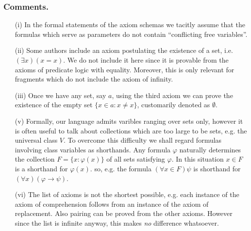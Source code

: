 \subsubsection{Comments.}
\begin{itemize}
\item[(i)] In the formal statements of the axiom schemas we tacitly assume that the formulas which serve as
           parameters do not contain ``conflicting free variables''.
\item[(ii)] Some authors include an axiom postulating the existence of a set, i.e. $(\exists x)(x=x)$.
            We do not include it here since it is provable from the axioms of predicate logic with equality.
            Moreover, this is only relevant for fragments which do not include the axiom of infinity.
\item[(iii)] Once we have any set, say $a$, using the third axiom we can prove the existence of the empty set $\{x\in a:x\neq x\}$,
            customarily denoted as $\emptyset$.

 \item[(v)] Formally, our language admits varibles ranging over sets only, however it is
            often useful to talk about collections which are too large to be sets, e.g.
            the universal class $V$. To overcome this difficulty we shall regard formulas
            involving class variables as shorthands. Any formula $\varphi$ naturally determines
            the collection $F=\{x:\varphi(x)\}$ of all sets satisfying $\varphi$. In this
            situation $x\in F$ is a shorthand for $\varphi(x)$. so, e.g. the formula
            $(\forall x\in F)\psi$ is shorthand for $(\forall x)(\varphi\rightarrow\psi)$.
\item[(vi)] The list of axioms is not the shortest possible, e.g. each instance of the axiom of comprehension follows from an instance of the axiom of
            replacement. Also pairing can be proved from the other axioms. However since the list is infinite anyway, this makes \emph{no} difference
            whatsoever.


\end{itemize}


\smallskip


